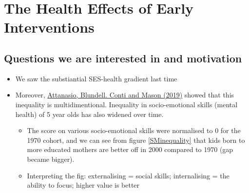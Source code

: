 \pagebreak\newpage
\newpage
\chapter{The Health Effects of Early Interventions}

 
\section{Questions we are interested in and motivation}

\begin{itemize}
\item We saw the substiantial SES-health gradient last time
        \item Moreover, \href{https://www.sciencedirect.com/science/article/pii/S0047272720300359}{Attanasio, Blundell. Conti and Mason (2019)} showed that this inequality is multidimentional. Inequality in socio-emotional skills (mental health) of 5 year olds has also widened over time.
        \begin{itemize}
        \item  The score on various socio-emotional skills were normalised to 0 for the 1970 cohort, and we can see from figure \ref{SMinequality} that kids born to more educated mothers are better off in 2000 compared to 1970 (gap became bigger).
        \item Interpreting the fig: externalising = social skills; internalising = the ability to focus; higher value is better
          \end{itemize}
        

\end{itemize}
